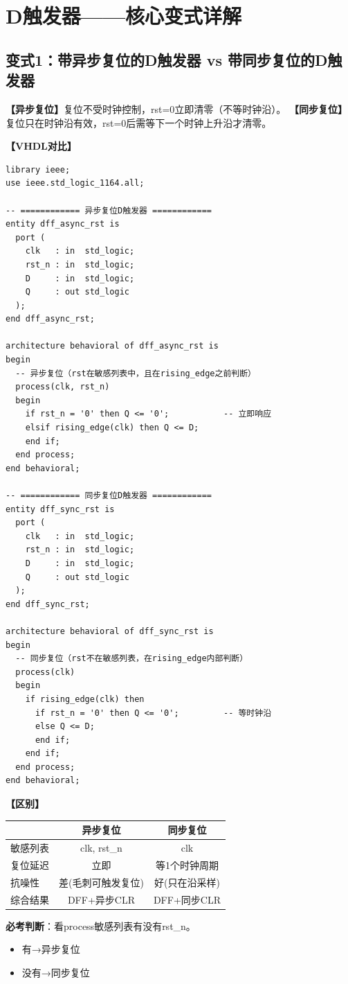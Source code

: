\chapter{D触发器——核心变式详解}

\section{变式1：带异步复位的D触发器 vs 带同步复位的D触发器}

\begin{detailbox}[完整教学]
\textbf{【异步复位】}复位不受时钟控制，rst=0立即清零（不等时钟沿）。
\textbf{【同步复位】}复位只在时钟沿有效，rst=0后需等下一个时钟上升沿才清零。

\textbf{【VHDL对比】}
\begin{lstlisting}[caption={异步复位D触发器 vs 同步复位D触发器}]
library ieee;
use ieee.std_logic_1164.all;

-- ============ 异步复位D触发器 ============
entity dff_async_rst is
  port (
    clk   : in  std_logic;
    rst_n : in  std_logic;
    D     : in  std_logic;
    Q     : out std_logic
  );
end dff_async_rst;

architecture behavioral of dff_async_rst is
begin
  -- 异步复位（rst在敏感列表中，且在rising_edge之前判断）
  process(clk, rst_n)
  begin
    if rst_n = '0' then Q <= '0';           -- 立即响应
    elsif rising_edge(clk) then Q <= D;
    end if;
  end process;
end behavioral;

-- ============ 同步复位D触发器 ============
entity dff_sync_rst is
  port (
    clk   : in  std_logic;
    rst_n : in  std_logic;
    D     : in  std_logic;
    Q     : out std_logic
  );
end dff_sync_rst;

architecture behavioral of dff_sync_rst is
begin
  -- 同步复位（rst不在敏感列表，在rising_edge内部判断）
  process(clk)
  begin
    if rising_edge(clk) then
      if rst_n = '0' then Q <= '0';         -- 等时钟沿
      else Q <= D;
      end if;
    end if;
  end process;
end behavioral;
\end{lstlisting}

\textbf{【区别】}
\begin{center}
\begin{tabular}{|l|c|c|}
\hline & 异步复位 & 同步复位 \\
\hline
敏感列表 & clk, rst\_n & clk \\
复位延迟 & 立即 & 等1个时钟周期 \\
抗噪性 & 差(毛刺可触发复位) & 好(只在沿采样) \\
综合结果 & DFF+异步CLR & DFF+同步CLR \\
\hline
\end{tabular}
\end{center}

\begin{examfocus}
\textbf{必考判断}：看process敏感列表有没有rst\_n。
\begin{itemize}
  \item 有→异步复位
  \item 没有→同步复位
\end{itemize}
\end{examfocus}
\end{detailbox}


